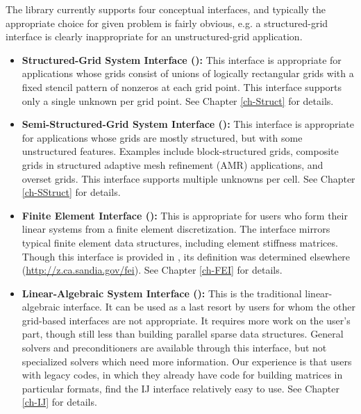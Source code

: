 The \hypre{} library currently supports four conceptual interfaces,
and typically the appropriate choice for given problem is fairly
obvious, e.g. a structured-grid interface is clearly inappropriate for
an unstructured-grid application.


\begin{itemize}

\item
{\bf Structured-Grid System Interface ():} This interface is
appropriate for applications whose grids consist of unions of logically
rectangular grids with a fixed stencil pattern of nonzeros at each grid point.
This interface supports only a single unknown per grid point.  See Chapter
\ref{ch-Struct} for details.

\item
{\bf Semi-Structured-Grid System Interface ():} This
interface is appropriate for applications whose grids are mostly
structured, but with some unstructured features.  Examples include
block-structured grids, composite grids in structured adaptive mesh
refinement (AMR) applications, and overset grids.  This interface
supports multiple unknowns per cell. See Chapter \ref{ch-SStruct} for details.

\item
{\bf Finite Element Interface ():} This is appropriate for
users who form their linear systems from a finite element
discretization.  The interface mirrors typical finite element data
structures, including element stiffness matrices.  Though this
interface is provided in \hypre{}, its definition was determined
elsewhere (\url{http://z.ca.sandia.gov/fei}). See Chapter \ref{ch-FEI}
for details.

\item
{\bf Linear-Algebraic System Interface ():} This is the
traditional linear-algebraic interface.  It can be used as a last
resort by users for whom the other grid-based interfaces are not
appropriate.  It requires more work on the user's part, though still
less than building parallel sparse data structures.  General solvers
and preconditioners are available through this interface, but not
specialized solvers which need more information.  Our experience is
that users with legacy codes, in which they already have code for
building matrices in particular formats, find the IJ interface
relatively easy to use. See Chapter \ref{ch-IJ} for details.

\end{itemize}


